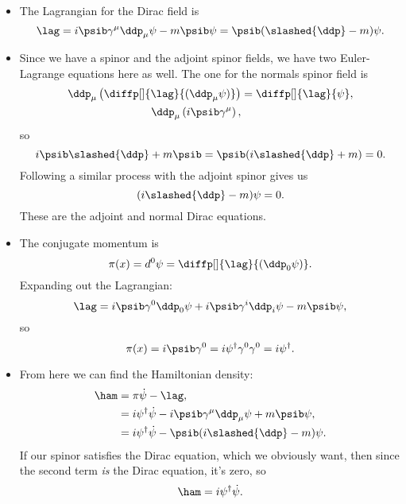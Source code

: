 \begin{itemize}
    \item The Lagrangian for the Dirac field is
        \begin{equation*}
            \lag = i\psib\gamma^{\mu}\ddp_{\mu}\psi - m\psib\psi = \psib(\slashed{\ddp} - m)\psi .
        \end{equation*}
    \item Since we have a spinor and the adjoint spinor fields, we have two Euler-Lagrange equations here as well. The one for the normals spinor field is
        \begin{align*}
            \ddp_{\mu}\left( \diffp[]{\lag}{(\ddp_{\mu}\psi)} \right) &= \diffp[]{\lag}{\psi}, \\
            \ddp_{\mu} \left( i\psib\gamma^{\mu} \right),
        \end{align*}
        so
        \begin{equation*}
            i\psib\slashed{\ddp} + m\psib = \psib(i\slashed{\ddp} + m) = 0.
        \end{equation*}
        Following a similar process with the adjoint spinor gives us
        \begin{equation*}
            (i\slashed{\ddp} - m)\psi = 0.
        \end{equation*}
        These are the adjoint and normal Dirac equations.
    \item The conjugate momentum is 
        \begin{equation*}
            \pi(x) = d^0\psi = \diffp[]{\lag}{(\ddp_0\psi)}.
        \end{equation*}
        Expanding out the Lagrangian:
        \begin{equation*}
            \lag = i\psib\gamma^0\ddp_0\psi + i\psib\gamma^i\ddp_i\psi - m\psib\psi,
        \end{equation*}
        so
        \begin{equation*}
            \pi(x) = i\psib\gamma^0 = i\psi^{\dagger}\gamma^0\gamma^0 = i\psi^{\dagger}.
        \end{equation*}
    \item From here we can find the Hamiltonian density:
        \begin{align*}
            \ham &= \pi\dot{\psi} - \lag, \\
            &= i\psi^{\dagger}\dot{\psi} - i\psib\gamma^{\mu}\ddp_{\mu}\psi + m\psib\psi, \\
            &= i\psi^{\dagger}\dot{\psi} - \psib(i\slashed{\ddp}-m)\psi.
        \end{align*}
        If our spinor satisfies the Dirac equation, which we obviously want, then since the second term \textit{is} the Dirac equation, it's zero, so
        \begin{equation}
            \ham = i\psi^{\dagger}\dot{\psi}.\label{DiracHamiltonianDensity}
        \end{equation}
\end{itemize}

